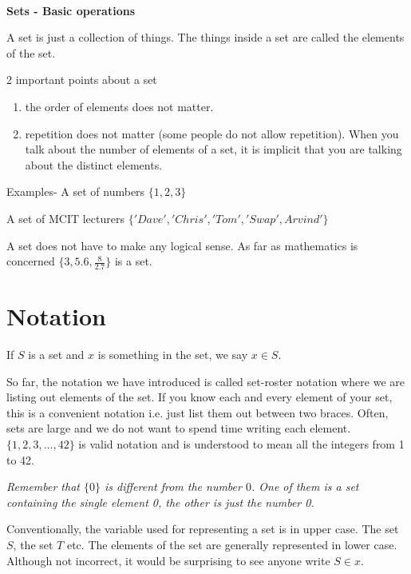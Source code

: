 \documentclass[12pt]{article}
\begin{document}
\begin{center}
\\
\vspace{1cm}
\end{center}


\medskip\noindent
	

{\bf Sets - Basic operations}

A set is just a collection of things. The things inside a set are called the elements of the set.

2 important points about a set

\begin{enumerate}
\item the order of elements does not matter.
\item repetition does not matter (some people do not allow repetition). When you talk about the number of elements of a set, it is implicit that you are talking about the distinct elements.
\end{enumerate}

Examples- 
A set of numbers $\{1,2,3\}$

A set of MCIT lecturers $\{'Dave','Chris', 'Tom', 'Swap', Arvind'\}$

A set does not have to make any logical sense. As far as mathematics is concerned $\{3, 5.6, \frac{8}{2.7}\}$ is a set.

\section*{Notation}

If $S$ is a set and $x$ is something in the set, we say $x \in S$.

So far, the notation we have introduced is called set-roster notation where we are listing out elements of the set. If you know each and every element of your set, this is a convenient notation i.e. just list them out between two braces. Often, sets are large and we do not want to spend time writing each element. $\{1,2,3,\ldots,42\}$ is valid notation and is understood to mean all the integers from 1 to 42.

\emph{Remember that $\{0\}$ is different from the number $0$. One of them is a set containing the single element 0, the other is just the number 0. }

Conventionally, the variable used for representing a set is in upper case. The set $S$, the set $T$ etc. The elements of the set are generally represented in lower case. Although not incorrect, it would be surprising to see anyone write $S \in x$.  
\end{document}
